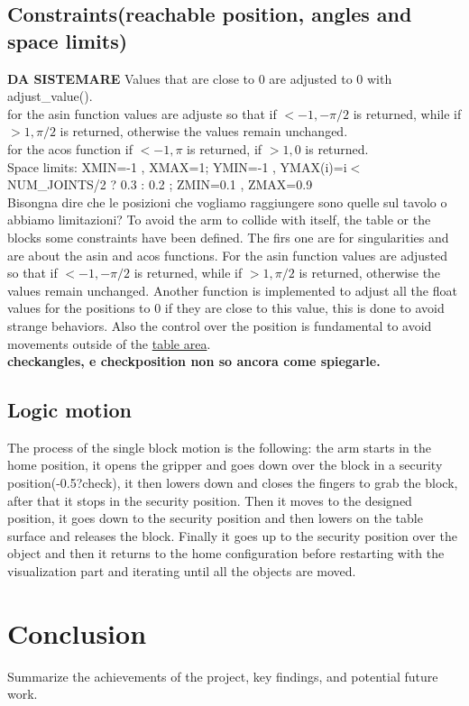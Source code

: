 \documentclass[12pt,a4paper]{article}
\begin{document}
\subsection{Constraints(reachable position, angles and space limits)}\label{subsec:constraints}
\textbf{DA SISTEMARE} Values that are close to 0 are adjusted to 0 with adjust\_value().\\
for the asin function values are adjuste so that if $<-1, -\pi/2$ is returned, while if $>1, \pi/2$ is returned, otherwise the values remain unchanged.\\
for the acos function if $<-1, \pi$ is returned, if $>1, 0$ is returned.\\
Space limits: XMIN=-1 , XMAX=1; YMIN=-1 , YMAX(i)=i$<$NUM\_JOINTS/2 ? 0.3 : 0.2 ; ZMIN=0.1 , ZMAX=0.9\\
Bisongna dire che le posizioni che vogliamo raggiungere sono quelle sul tavolo o abbiamo limitazioni?
To avoid the arm to collide with itself, the table or the blocks some constraints have been defined. The firs one are for singularities and are about the asin and acos functions. For the asin function values are adjusted so that if $<-1, -\pi/2$ is returned, while if $>1, \pi/2$ is returned, otherwise the values remain unchanged. Another function is implemented to adjust all the float values for the positions to 0 if they are close to this value, this is done to avoid strange behaviors. Also the control over the position is fundamental to avoid movements outside of the \uline{table area}.\\
\textbf{checkangles, e checkposition non so ancora come spiegarle.}

\subsection{Logic motion}\label{subsec:logic}
The process of the single block motion is the following: the arm starts in the home position, it opens the gripper and goes down over the block in a security position(-0.5?check), it then lowers down and closes the fingers to grab the block, after that it stops in the security position. Then it moves to the designed position, it goes down to the security position and then lowers on the table surface and releases the block. Finally it goes up to the security position over the object and then it returns to the home configuration before restarting with the visualization part and iterating until all the objects are moved.

\section{Conclusion}\label{sec:conclusion}
Summarize the achievements of the project, key findings, and potential future work. 
\end{document}
